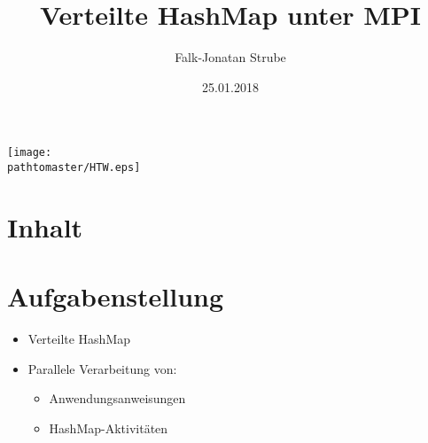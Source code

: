 \documentclass[11pt
]{beamer}
\author{Falk-Jonatan Strube}
\title{Verteilte HashMap unter MPI}
\date{25.01.2018}
\gdef\pathtomaster{_LaTeX_master}
\begin{document}
\begin{frame}[plain]
\begin{center}
\texttt{[image: \\pathtomaster/HTW.eps]}
\end{center}
\maketitle
\end{frame}

\section*{Inhalt}
\begin{frame}
\tableofcontents
\end{frame}

\section{Aufgabenstellung}
\begin{frame}
\begin{itemize}
\item Verteilte HashMap
\item Parallele Verarbeitung von:
\begin{itemize}
\item Anwendungsanweisungen
\item HashMap-Aktivitäten
\end{itemize}
\end{itemize}
\end{frame}
\end{document}
